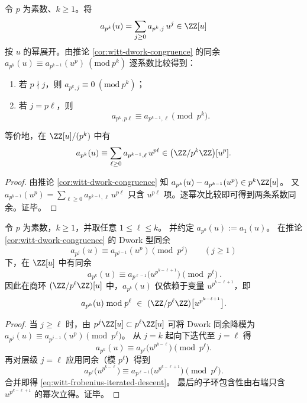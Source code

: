 \begin{proposition}\label{prop:witt-pk-sparsification}
令 \(p\) 为素数、\(k\ge 1\)。将
\[
a_{p^k}(u)=\sum_{j\ge 0}a_{p^k,j}\,u^j\in\ZZ[u]
\]
按 \(u\) 的幂展开。由推论 \ref{cor:witt-dwork-congruence} 的同余
\(
a_{p^k}(u)\equiv a_{p^{k-1}}(u^p)\ (\mathrm{mod}\ p^k)
\)
逐系数比较得到：
\begin{enumerate}
  \item 若 \(p\nmid j\)，则 \(a_{p^k,j}\equiv 0\ (\mathrm{mod}\ p^k)\)；
  \item 若 \(j=p\ell\)，则
  \[
  a_{p^k,p\ell}\equiv a_{p^{k-1},\ell}\pmod{p^k}.
  \]
\end{enumerate}
等价地，在 \(\ZZ[u]/(p^k)\) 中有
\[
a_{p^k}(u)\equiv \sum_{\ell\ge 0}a_{p^{k-1},\ell}\,u^{p\ell}\in \bigl(\ZZ/p^k\ZZ\bigr)[u^p].
\]
\end{proposition}
\begin{proof}
由推论 \ref{cor:witt-dwork-congruence} 知
\(
a_{p^k}(u)-a_{p^{k-1}}(u^p)\in p^k\ZZ[u]
\)。
又
\(
a_{p^{k-1}}(u^p)=\sum_{\ell\ge 0}a_{p^{k-1},\ell}\,u^{p\ell}
\)
只含 \(u^{p\ell}\) 项。逐幂次比较即可得到两条系数同余。证毕。
\end{proof}

\begin{proposition}\label{prop:witt-frobenius-iterated-descent}
令 \(p\) 为素数，\(k\ge 1\)，并取任意 \(1\le \ell\le k\)。
并约定 \(a_{p^0}(u):=a_1(u)\)。
在推论 \ref{cor:witt-dwork-congruence} 的 Dwork 型同余
\[
a_{p^j}(u)\equiv a_{p^{j-1}}(u^p)\pmod{p^j}\qquad(j\ge 1)
\]
下，在 \(\ZZ[u]\) 中有同余
\begin{equation}\label{eq:witt-frobenius-iterated-descent}
\boxed{\ a_{p^k}(u)\equiv a_{p^{\ell-1}}\!\bigl(u^{p^{k-\ell+1}}\bigr)\pmod{p^\ell}\ }.
\end{equation}
因此在商环 \((\ZZ/p^\ell\ZZ)[u]\) 中，\(a_{p^k}(u)\) 仅依赖于变量 \(u^{p^{k-\ell+1}}\)，即
\[
a_{p^k}(u)\bmod p^\ell\ \in\ (\ZZ/p^\ell\ZZ)\bigl[u^{p^{k-\ell+1}}\bigr].
\]
\end{proposition}
\begin{proof}
当 \(j\ge \ell\) 时，由 \(p^j\ZZ[u]\subset p^\ell\ZZ[u]\) 可将 Dwork 同余降模为
\(
a_{p^j}(u)\equiv a_{p^{j-1}}(u^p)\pmod{p^\ell}
\)。
从 \(j=k\) 起向下迭代至 \(j=\ell\) 得
\[
a_{p^k}(u)\equiv a_{p^\ell}\!\bigl(u^{p^{k-\ell}}\bigr)\pmod{p^\ell}.
\]
再对层级 \(j=\ell\) 应用同余（模 \(p^\ell\)）得到
\[
a_{p^\ell}\!\bigl(u^{p^{k-\ell}}\bigr)\equiv a_{p^{\ell-1}}\!\bigl(u^{p^{k-\ell+1}}\bigr)\pmod{p^\ell}.
\]
合并即得 \eqref{eq:witt-frobenius-iterated-descent}。
最后的子环包含性由右端只含 \(u^{p^{k-\ell+1}}\) 的幂次立得。证毕。
\end{proof}

